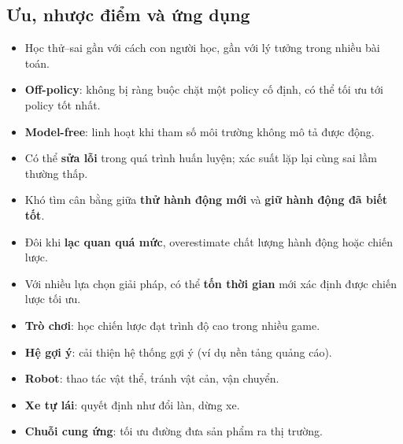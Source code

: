 \begin{vidu}[title={Sơ đồ thuật toán Q-Learning}]
\end{vidu}

\subsection{Ưu, nhược điểm và ứng dụng}

\begin{tinhchat}[title={Ưu điểm Q-Learning}]
\begin{itemize}
  \item Học thử--sai gần với cách con người học, gần với lý tưởng trong nhiều bài toán.
  \item \textbf{Off-policy}: không bị ràng buộc chặt một policy cố định, có thể tối ưu tới policy tốt nhất.
  \item \textbf{Model-free}: linh hoạt khi tham số môi trường không mô tả được động.
  \item Có thể \textbf{sửa lỗi} trong quá trình huấn luyện; xác suất lặp lại cùng sai lầm thường thấp.
\end{itemize}
\end{tinhchat}

\begin{luuy}[title={Nhược điểm Q-Learning}]
\begin{itemize}
  \item Khó tìm cân bằng giữa \textbf{thử hành động mới} và \textbf{giữ hành động đã biết tốt}.
  \item Đôi khi \textbf{lạc quan quá mức}, overestimate chất lượng hành động hoặc chiến lược.
  \item Với nhiều lựa chọn giải pháp, có thể \textbf{tốn thời gian} mới xác định được chiến lược tối ưu.
\end{itemize}
\end{luuy}

\begin{ynghia}[title={Ứng dụng Q-Learning}]
\begin{itemize}
  \item \textbf{Trò chơi}: học chiến lược đạt trình độ cao trong nhiều game.
  \item \textbf{Hệ gợi ý}: cải thiện hệ thống gợi ý (ví dụ nền tảng quảng cáo).
  \item \textbf{Robot}: thao tác vật thể, tránh vật cản, vận chuyển.
  \item \textbf{Xe tự lái}: quyết định như đổi làn, dừng xe.
  \item \textbf{Chuỗi cung ứng}: tối ưu đường đưa sản phẩm ra thị trường.
\end{itemize}
\end{ynghia}
